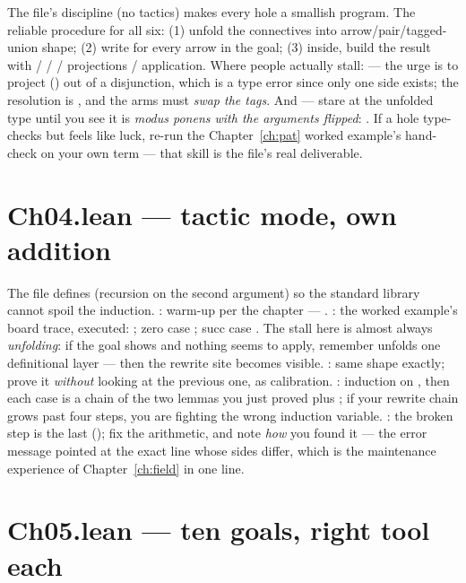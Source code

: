 The file's discipline (no tactics) makes every hole a smallish program.
The reliable procedure for all six: (1) unfold the connectives into
arrow/pair/tagged-union shape; (2) write  for every arrow in
the goal; (3) inside, build the result with  /
 /  / projections / application. Where people
actually stall:  --- the urge is to project ()
out of a disjunction, which is a type error since only one side exists;
the resolution is , and the arms must \emph{swap the tags}. And
 --- stare at the unfolded type
 until you see it is \emph{modus ponens
with the arguments flipped}: . If a hole
type-checks but feels like luck, re-run the Chapter~\ref{ch:pat} worked
example's hand-check on your own term --- that skill is the file's real
deliverable.

\section{Ch04.lean --- tactic mode, own addition}

The file defines  (recursion on the second argument) so
the standard library cannot spoil the induction. \textbf{}:
warm-up per the chapter --- . \textbf{}: the worked example's board
trace, executed: ; zero case ; succ
case . The stall here is almost always
\emph{unfolding}: if the goal shows  and nothing
seems to apply, remember  unfolds one
definitional layer --- then the  rewrite site becomes visible.
\textbf{}: same shape exactly; prove it \emph{without}
looking at the previous one, as calibration.
\textbf{}: induction on , then each case is a
chain of the two lemmas you just proved plus ; if your rewrite
chain grows past four steps, you are fighting the wrong induction
variable. \textbf{}: the broken step is the last
(); fix the arithmetic, and note \emph{how} you found it ---
the error message pointed at the exact line whose sides differ, which
is the maintenance experience of Chapter~\ref{ch:field} in one line.

\section{Ch05.lean --- ten goals, right tool each}

